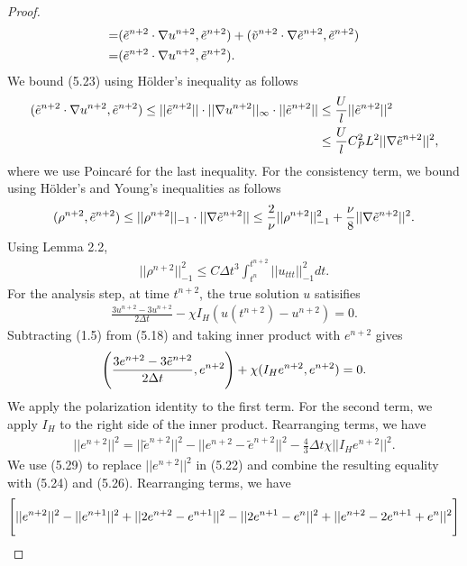 \documentclass[10pt,a4paper]{amsart}
\begin{document}
\begin{proof}
\begin{align}
        =&(\tilde{e}^{n+2}\cdot \nabla u^{n+2}, \Tilde{e}^{n+2})+(\tilde{v}^{n+2}\cdot \nabla \Tilde{e}^{n+2}, \Tilde{e}^{n+2}) \notag \\
        =&(\tilde{e}^{n+2}\cdot \nabla u^{n+2}, \Tilde{e}^{n+2}).    \end{align}
    We bound (5.23) using H\"{o}lder's inequality as follows
    \begin{align}
        (\tilde{e}^{n+2}\cdot \nabla u^{n+2}, \Tilde{e}^{n+2}) 
        \leq ||\tilde{e}^{n+2}||\cdot ||\nabla u^{n+2}||_\infty \cdot ||\Tilde{e}^{n+2}|| &\leq \frac{U}{l}||\tilde{e}^{n+2}||^2 \notag \\
        &\leq \frac{U}{l}C_P^2L^2 ||\nabla \tilde{e}^{n+2}||^2,
    \end{align}
    where we use Poincar\'e for the last inequality. For the consistency term, we bound using H\"{o}lder's and Young's inequalities as follows
    \begin{align}
        (\rho^{n+2}, \Tilde{e}^{n+2})\leq ||\rho^{n+2}||_{-1} \cdot ||\nabla \Tilde{e}^{n+2}||\leq \frac{2}{\nu}||\rho^{n+2}||_{-1}^2+\frac{\nu}{8}||\nabla \Tilde{e}^{n+2}||^2.
    \end{align}
    Using Lemma 2.2, 
    \begin{align}
        ||\rho^{n+2}||_{-1}^2\leq C\Delta t^3\int_{t^n}^{t^{n+2}}||u_{ttt}||_{-1}^2dt.
    \end{align}
    For the analysis step, at time $t^{n+2}$, the true solution $u$ satisifies
    \begin{align}
        \frac{3u^{n+2}-3u^{n+2}}{2\Delta t}-\chi I_H(u(t^{n+2})-u^{n+2})=0.
    \end{align}
    Subtracting (1.5) from (5.18) and taking inner product with $e^{n+2}$ gives
    \begin{align}
        \Bigg(\frac{3e^{n+2}-3\Tilde{e}^{n+2}}{2\Delta t}, e^{n+2}\Bigg)+\chi (I_He^{n+2},e^{n+2})=0.
    \end{align}
    We apply the polarization identity to the first term. For the second term, we apply $I_H$ to the right side of the inner product. Rearranging terms, we have 
    \begin{align}
        ||e^{n+2}||^2=||\tilde{e}^{n+2}||^2-||e^{n+2}-\tilde{e}^{n+2}||^2-\frac{4}{3}\Delta t\chi ||I_He^{n+2}||^2.
    \end{align}
    We use (5.29) to replace $||e^{n+2}||^2$ in (5.22) and combine the resulting equality with (5.24) and (5.26). Rearranging terms, we have
    \begin{align}
        &\Bigg[||e^{n+2}||^2-||e^{n+1}||^2+||2e^{n+2}-e^{n+1}||^2-||2e^{n+1}-e^n||^2+||e^{n+2}-2e^{n+1}+e^n||^2\Bigg] \notag  \\

\end{align}
\end{proof}
\end{document}
